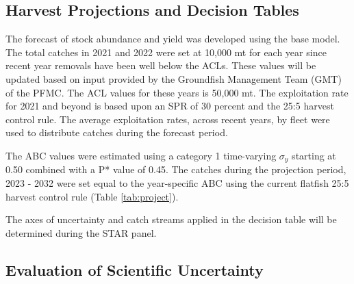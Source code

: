 \documentclass[11pt,
  english,
  a4paper,
]{article}
\begin{document}

\hypertarget{harvest-projections-and-decision-tables}{%
\subsection{Harvest Projections and Decision Tables}\label{harvest-projections-and-decision-tables}}

\leavevmode\tagmcend\tagstructend


The forecast of stock abundance and yield was developed using the base model. The total catches in 2021 and 2022 were set at 10,000 mt for each year since recent year removals have been well below the ACLs. These values will be updated based on input provided by the Groundfish Management Team (GMT) of the PFMC. The ACL values for these years is 50,000 mt. The exploitation rate for 2021 and beyond is based upon an SPR of 30 percent and the 25:5 harvest control rule. The average exploitation rates, across recent years, by fleet were used to distribute catches during the forecast period.

\leavevmode\tagmcend\tagstructend\par


The ABC values were estimated using a category 1 time-varying {\(\sigma_y\)\leavevmode\tagmcend\tagstructend} starting at 0.50 combined with a P* value of 0.45. The catches during the projection period, 2023 - 2032 were set equal to the year-specific ABC using the current flatfish 25:5 harvest control rule (Table \ref{tab:project}).

\leavevmode\tagmcend\tagstructend\par


The axes of uncertainty and catch streams applied in the decision table will be determined during the STAR panel.

\leavevmode\tagmcend\tagstructend\par


\hypertarget{evaluation-of-scientific-uncertainty}{%
\subsection{Evaluation of Scientific Uncertainty}\label{evaluation-of-scientific-uncertainty}}
\end{document}
